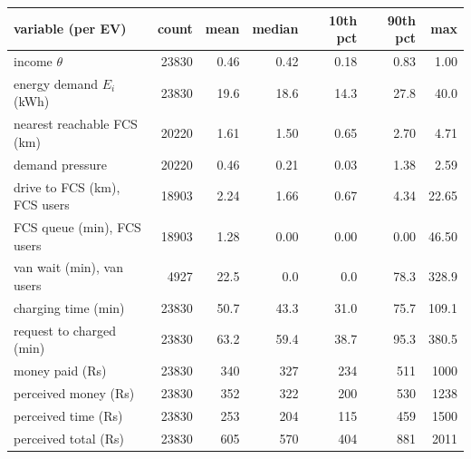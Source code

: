 \begin{tabular}{lrrrrrr}\toprule
variable (per EV) & count & mean & median & 10th pct & 90th pct & max \\ \midrule
income $\theta$ & 23830 & 0.46 & 0.42 & 0.18 & 0.83 & 1.00 \\
energy demand $E_i$ (kWh) & 23830 & 19.6 & 18.6 & 14.3 & 27.8 & 40.0 \\
nearest reachable FCS (km) & 20220 & 1.61 & 1.50 & 0.65 & 2.70 & 4.71 \\
demand pressure & 20220 & 0.46 & 0.21 & 0.03 & 1.38 & 2.59 \\
drive to FCS (km), FCS users & 18903 & 2.24 & 1.66 & 0.67 & 4.34 & 22.65 \\
FCS queue (min), FCS users & 18903 & 1.28 & 0.00 & 0.00 & 0.00 & 46.50 \\
van wait (min), van users & 4927 & 22.5 & 0.0 & 0.0 & 78.3 & 328.9 \\
charging time (min) & 23830 & 50.7 & 43.3 & 31.0 & 75.7 & 109.1 \\
request to charged (min) & 23830 & 63.2 & 59.4 & 38.7 & 95.3 & 380.5 \\
money paid (Rs) & 23830 & 340 & 327 & 234 & 511 & 1000 \\
perceived money (Rs) & 23830 & 352 & 322 & 200 & 530 & 1238 \\
perceived time (Rs) & 23830 & 253 & 204 & 115 & 459 & 1500 \\
perceived total (Rs) & 23830 & 605 & 570 & 404 & 881 & 2011 \\
\bottomrule\end{tabular}
